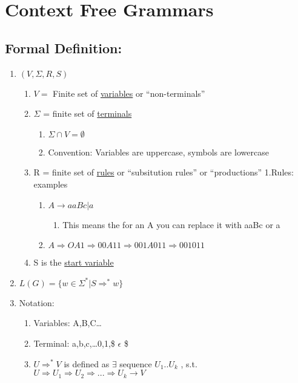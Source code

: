 \documentclass[11pt]{article}
\begin{document}
\section{Context Free Grammars}
\label{sec-3}

\subsection{Formal Definition:}
\label{sec-3.1}

\begin{enumerate}
\item $(V,\Sigma, R, S)$

\begin{enumerate}
\item $V =$ Finite set of \underline{variables} or ``non-terminals''
\item $\Sigma$ =  finite set of \underline{terminals}

\begin{enumerate}
\item $\Sigma \cap V = \emptyset$
\item Convention: Variables are uppercase, symbols are lowercase
\end{enumerate}

\item R = finite set of \underline{rules} or ``subsitution rules'' or ``productions''
         1.Rules: examples

\begin{enumerate}
\item $A \rightarrow aaBc | a$

\begin{enumerate}
\item This means the for an A you can replace it with aaBc or a
\end{enumerate}

\item $A \Rightarrow OA1 \Rightarrow 00A11 \Rightarrow 001A011 \Rightarrow 001011$
\end{enumerate}

\item S is the \underline{start variable}
\end{enumerate}

\item $L(G) = \{w\in \Sigma^* | S \Rightarrow^* w\}$
\item Notation:

\begin{enumerate}
\item Variables: A,B,C\ldots{}
\item Terminal: a,b,c,\ldots{}0,1,\$ $\epsilon$ \$
\item $U \Rightarrow^* V$ is defined as $\exists$ sequence
         $U_1..U_k$ , s.t. $U \Rightarrow U_1 \Rightarrow  U_2
         \Rightarrow ... \Rightarrow U_k \rightarrow V$
\end{enumerate}

\end{enumerate}
\end{document}
